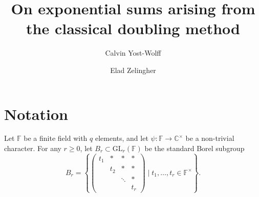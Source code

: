 \documentclass[12pt, reqno]{amsart}
\title{On exponential sums arising from the classical doubling method}
\author{Calvin Yost-Wolff}
\author{Elad Zelingher}
\theoremstyle{definition}
\theoremstyle{definition}
\theoremstyle{definition}
\newcommand{\cComplex}{\mathbb{C}}
\newcommand{\multiplicativegroup}[1]{#1^{\times}}
\newcommand{\fieldCharacter}{\psi}
\newcommand{\GL}{\mathrm{GL}}
\newcommand{\finiteField}{\mathbb{F}}
\begin{document}
\begin{abstract}
\end{abstract}
\maketitle

\section{Notation}
Let $\finiteField$ be a finite field with $q$ elements, and let $\fieldCharacter \colon \finiteField \to \multiplicativegroup{\cComplex}$ be a non-trivial character. For any $r \ge 0$, let $B_r \subset \GL_r\left(\finiteField\right)$ be the standard Borel subgroup
$$B_r = \left\{ \begin{pmatrix}
	t_1 & \ast & \ast & \ast\\
	& t_2 & \ast & \ast \\
	& & \ddots & \ast\\
	& & & t_r
\end{pmatrix} \mid t_1,\dots,t_r \in \multiplicativegroup{\finiteField} \right\}.$$
\end{document}
